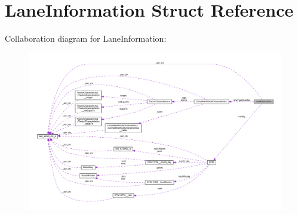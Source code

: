 \hypertarget{structLaneInformation}{}\section{Lane\+Information Struct Reference}
\label{structLaneInformation}


Collaboration diagram for Lane\+Information\+:\nopagebreak
\begin{figure}[H]
\begin{center}
\leavevmode
\includegraphics[width=350pt]{structLaneInformation__coll__graph}
\end{center}
\end{figure}
